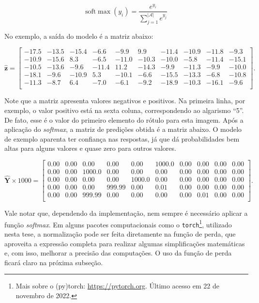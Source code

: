 \documentclass[12pt,twoside,brazilian]{book}
\begin{document}
\[
\text{soft}\max(y_i) = \frac{e^{y_i}}{\sum_{j=1}^{|\mathcal A|} e^{y_j}}
\]

No exemplo, a saída do modelo é a matriz abaixo:

\[
\hat{\mathbf z} = \left[\begin{array}{rrrrrrrrrr}
  -17.5 & -13.5 & -15.4 & -6.6 & -9.9 & 9.9 & -11.4 & -10.9 & -11.8 & -9.3 \\ 
  -10.9 & -15.6 & 8.3 & -6.5 & -11.0 & -10.3 & -10.0 & -5.8 & -11.4 & -15.1 \\ 
  -10.5 & -13.6 & -9.6 & -11.4 & 11.2 & -14.3 & -9.9 & -11.3 & -9.9 & -10.0 \\ 
  -18.1 & -9.6 & -10.9 & 5.3 & -10.1 & -6.6 & -15.5 & -13.3 & -6.8 & -10.8 \\ 
  -11.3 & -8.7 & 6.4 & -7.0 & -6.1 & -9.2 & -18.9 & -10.3 & -16.1 & -9.6 \\ 
\end{array}\right].
\]

Note que a matriz apresenta valores negativos e positivos. Na primeira
linha, por exemplo, o valor positivo está na sexta coluna,
correspondendo ao algarismo ``5''. De fato, esse é o valor do primeiro
elemento do rótulo para esta imagem. Após a aplicação do \emph{softmax},
a matriz de predições obtida é a matriz abaixo. O modelo de exemplo
aparenta ter confiança nas respostas, já que dá probabilidades bem altas
para alguns valores e quase zero para outros valores.

\[
\hat{\mathbf Y}\times 1000 = \left[\begin{array}{rrrrrrrrrr}
  0.00 & 0.00 & 0.00 & 0.00 & 0.00 & 1000.0 & 0.00 & 0.00 & 0.00 & 0.00 \\ 
  0.00 & 0.00 & 1000.0 & 0.00 & 0.00 & 0.00 & 0.00 & 0.00 & 0.00 & 0.00 \\ 
  0.00 & 0.00 & 0.00 & 0.00 & 1000.0 & 0.00 & 0.00 & 0.00 & 0.00 & 0.00 \\ 
  0.00 & 0.00 & 0.00 & 999.99 & 0.00 & 0.01 & 0.00 & 0.00 & 0.00 & 0.00 \\ 
  0.00 & 0.00 & 999.99 & 0.00 & 0.00 & 0.00 & 0.00 & 0.01 & 0.00 & 0.00 \\
\end{array}\right].
\]

Vale notar que, dependendo da implementação, nem sempre é necessário
aplicar a função \emph{softmax}. Em alguns pacotes computacionais como o
\texttt{torch}\footnote{Mais sobre o (py)torch:
  \url{https://pytorch.org}. Último acesso em 22 de novembro de 2022.},
utilizado nesta tese, a normalização pode ser feita diretamente na
função de perda, que aproveita a expressão completa para realizar
algumas simplificações matemáticas e, com isso, melhorar a precisão das
computações. O uso da função de perda ficará claro na próxima subseção.
\end{document}
